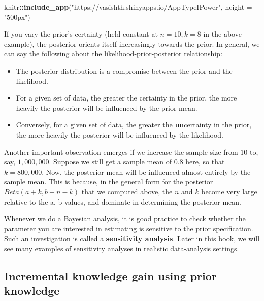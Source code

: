 \documentclass[12pt,]{krantz}
\newenvironment{Shaded}{\begin{snugshade}}{\end{snugshade}}
\newcommand{\DataTypeTok}[1]{\textcolor[rgb]{0.13,0.29,0.53}{#1}}
\newcommand{\KeywordTok}[1]{\textcolor[rgb]{0.13,0.29,0.53}{\textbf{#1}}}
\newcommand{\NormalTok}[1]{#1}
\newcommand{\OperatorTok}[1]{\textcolor[rgb]{0.81,0.36,0.00}{\textbf{#1}}}
\newcommand{\StringTok}[1]{\textcolor[rgb]{0.31,0.60,0.02}{#1}}
\providecommand{\tightlist}{%
  \setlength{\itemsep}{0pt}\setlength{\parskip}{0pt}}
\begin{document}
\begin{Shaded}
\begin{Highlighting}[]
\NormalTok{knitr}\OperatorTok{::}\KeywordTok{include_app}\NormalTok{(}\StringTok{"https://vasishth.shinyapps.io/AppTypeIPower"}\NormalTok{, }
  \DataTypeTok{height =} \StringTok{"500px"}\NormalTok{)}
\end{Highlighting}
\end{Shaded}

If you vary the prior's certainty (held constant at \(n=10, k=8\) in the above example), the posterior orients itself increasingly towards the prior. In general, we can say the following about the likelihood-prior-posterior relationship:

\begin{itemize}
\tightlist
\item
  The posterior distribution is a compromise between the prior and the likelihood.
\item
  For a given set of data, the greater the certainty in the prior, the more heavily the posterior will be influenced by the prior mean.
\item
  Conversely, for a given set of data, the greater the \textbf{un}certainty in the prior, the more heavily the posterior will be influenced by the likelihood.
\end{itemize}

Another important observation emerges if we increase the sample size from \(10\) to, say, \(1,000,000\). Suppose we still get a sample mean of \(0.8\) here, so that \(k=800,000\). Now, the posterior mean will be influenced almost entirely by the sample mean. This is because, in the general form for the posterior \(Beta(a+k,b+n-k)\) that we computed above, the \(n\) and \(k\) become very large relative to the a, b values, and dominate in determining the posterior mean.

Whenever we do a Bayesian analysis, it is good practice to check whether the parameter you are interested in estimating is sensitive to the prior specification. Such an investigation is called a \textbf{sensitivity analysis}. Later in this book, we will see many examples of sensitivity analyses in realistic data-analysis settings.

\hypertarget{incremental-knowledge-gain-using-prior-knowledge}{%
\subsection{Incremental knowledge gain using prior knowledge}\label{incremental-knowledge-gain-using-prior-knowledge}}
\end{document}
